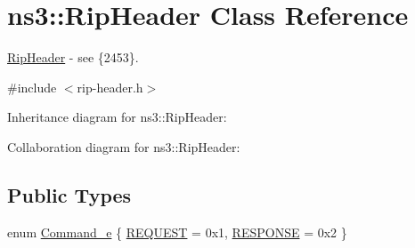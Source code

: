 \hypertarget{classns3_1_1RipHeader}{}\section{ns3\+:\+:Rip\+Header Class Reference}
\label{classns3_1_1RipHeader}


\hyperlink{classns3_1_1RipHeader}{Rip\+Header} -\/ see \{2453\}.  




{\ttfamily \#include $<$rip-\/header.\+h$>$}



Inheritance diagram for ns3\+:\+:Rip\+Header\+:


Collaboration diagram for ns3\+:\+:Rip\+Header\+:
\subsection*{Public Types}
\begin{DoxyCompactItemize}
\item 
enum \hyperlink{classns3_1_1RipHeader_a8c6ce779ee35c8b65446aaa202a6e789}{Command\+\_\+e} \{ \hyperlink{classns3_1_1RipHeader_a8c6ce779ee35c8b65446aaa202a6e789aeebbe2c504f996111c13da75ec0212d2}{R\+E\+Q\+U\+E\+ST} = 0x1, 
\hyperlink{classns3_1_1RipHeader_a8c6ce779ee35c8b65446aaa202a6e789a9f13028e2d4a57da73f592702d7b17c7}{R\+E\+S\+P\+O\+N\+SE} = 0x2
 \}
\end{DoxyCompactItemize}
